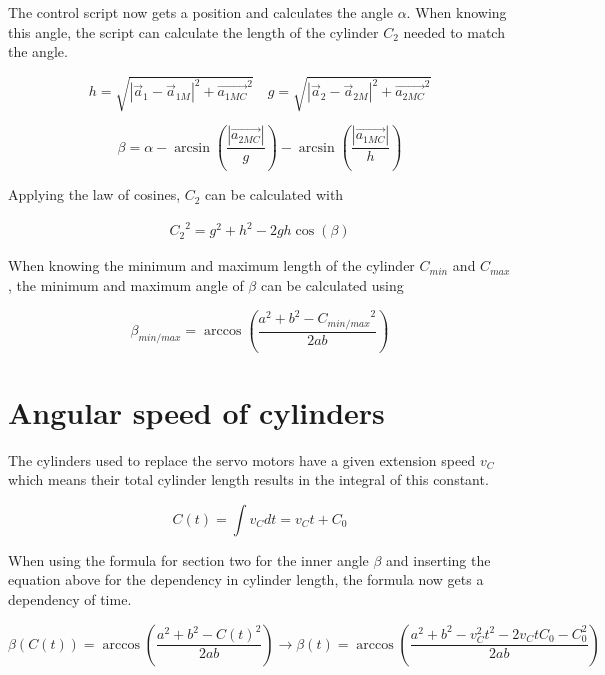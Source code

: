 \documentclass{article}
\begin{document}
    The control script now gets a position and calculates the angle $\alpha$. When knowing this angle, the script can calculate the length of the cylinder $C_2$ needed to match the angle.
    
    \begin{equation}
        h = \sqrt{ |\vec a_1 - \vec a_{1M}|^2  + {\vec{a_{1MC}}}^2 } \quad g = \sqrt{ | \vec a_2 - \vec a_{2M}|^2  + {\vec{a_{2MC}}}^2 }
    \end{equation}
    
    \begin{equation}
        \beta = \alpha - \arcsin{ \left(\frac{|\vec{a_{2MC}}|}{g}\right) } - \arcsin{ \left(\frac{|\vec{a_{1MC}}|}{h}\right) }
    \end{equation}
    
    Applying the law of cosines, $C_2$ can be calculated with
    
    \begin{equation}
        \begin{array}{c}
            {C_2}^2 = g^2 + h^2 - 2gh\cos(\beta) 
        \end{array}
    \end{equation}
    
    When knowing the minimum and maximum length of the cylinder $C_{min}$ and $C_{max}$, the minimum and maximum angle of $\beta$ can be calculated using
    
    \begin{equation}
        \beta_{min/max} = \arccos{ \left( \frac{a^2 + b^2 - {C_{min/max}}^2}{2ab} \right ) }
    \end{equation}
    
\section{Angular speed of cylinders}
    The cylinders used to replace the servo motors have a given extension speed $v_C$ which means their total cylinder length results in the integral of this constant.
    
    \begin{equation}
        C(t) = \int v_C dt = v_C t + C_0
    \end{equation}
    
    When using the formula for section two for the inner angle $\beta$ and inserting the equation above for the dependency in cylinder length, the formula now gets a dependency of time.
    
    \begin{equation}
        \beta(C(t)) = \arccos{ \left( \frac{a^2 + b^2 - C(t)^2}{2ab} \right ) } \xrightarrow{} 
        \beta(t) = \arccos{ \left( \frac{a^2 + b^2 - v_C^2t^2 - 2 v_C t C_0 - C_0^2}{2ab} \right ) }
    \end{equation}
    
\end{document}
